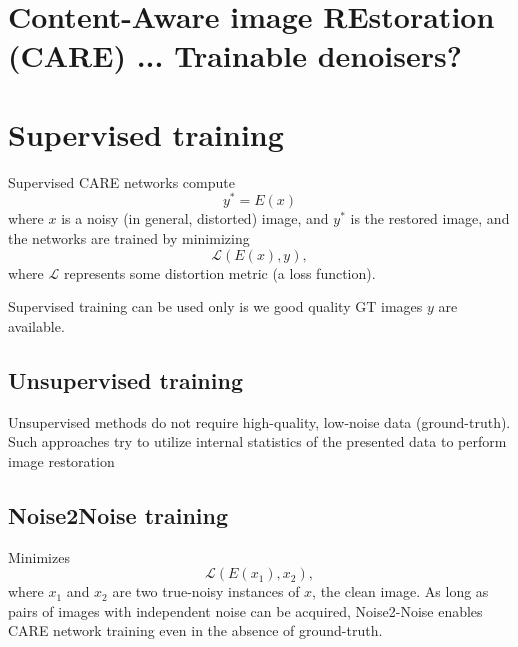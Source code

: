 \chapter{Content-Aware image REstoration (CARE) ... Trainable denoisers?}



\chapter{Supervised training}

Supervised CARE networks compute
\begin{equation}
  y^* = E(x)
\end{equation}
where $x$ is a noisy (in general, distorted) image, and $y^*$ is the restored image, and the networks are trained by minimizing
\begin{equation}
  \mathcal{L}(E(x), y),
\end{equation}
where $\mathcal{L}$ represents some distortion metric (a loss
function). %

Supervised training can be used only is we good quality GT images $y$
are
available. %

\section{Unsupervised training}

Unsupervised methods do not require high-quality, low-noise data
(ground-truth).  Such approaches try to utilize internal statistics of
the presented data to perform image
restoration %

\section{Noise2Noise training}


Minimizes
\begin{equation}
  {\mathcal L}(E(x_1),x_2),
\end{equation}
where $x_1$ and $x_2$ are two true-noisy instances of $x$, the clean
image. As long as pairs of images with independent noise can be
acquired, Noise2-Noise enables CARE network training even in the
absence of ground-truth. %

